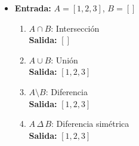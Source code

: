 \begin{enumerate}
\begin{itemize}
        \item \textbf{Entrada:} \( A = [1, 2, 3] \), \( B = [] \)
        \begin{enumerate}
            \item \( A \cap B \): Intersección\\
            \textbf{Salida:} \([]\)
    
            \item \( A \cup B \): Unión\\
            \textbf{Salida:} \([1, 2, 3]\)
    
            \item \( A \setminus B \): Diferencia\\
            \textbf{Salida:} \([1, 2, 3]\)
    
            \item \( A \, \Delta \, B \): Diferencia simétrica\\
            \textbf{Salida:} \([1, 2, 3]\)
        \end{enumerate}
    \end{itemize}
\end{enumerate}